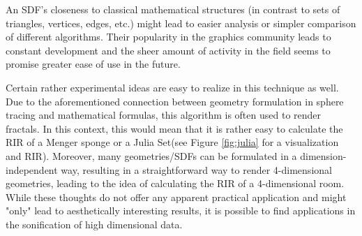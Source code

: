 \documentclass[twoside,a4paper]{article}
\begin{document}
An SDF's closeness to classical mathematical structures (in contrast to sets of triangles, vertices, edges, etc.) might lead to easier analysis or simpler comparison of different algorithms. Their popularity in the graphics community leads to constant development and the sheer amount of activity in the field seems to promise greater ease of use in the future. \

Certain rather experimental ideas are easy to realize in this technique as well. Due to the aforementioned connection between geometry formulation in sphere tracing and mathematical formulas, this algorithm is often used to render fractals. In this context, this would mean that it is rather easy to calculate the RIR of a Menger sponge or a Julia Set(see Figure \ref{fig:julia} for a visualization and RIR). Moreover, many geometries/SDFs can be formulated in a dimension-independent way, resulting in a straightforward way to render 4-dimensional geometries, leading to the idea of calculating the RIR of a 4-dimensional room. While these thoughts do not offer any apparent practical application and might "only" lead to aesthetically interesting results, it is possible to find applications in the sonification of high dimensional data.
\end{document}
